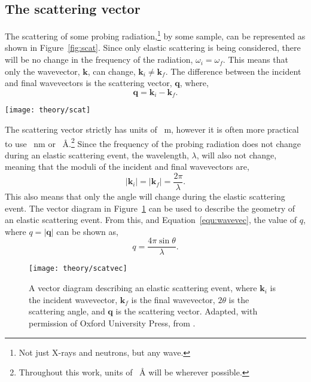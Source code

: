 \subsection{The scattering vector}
The scattering of some probing radiation,\footnote{Not just X-rays and neutrons, but any wave.} by some sample, can be represented as shown in Figure~\ref{fig:scat}.
Since only elastic scattering is being considered, there will be no change in the frequency of the radiation, $\omega_i = \omega_f$.
This means that only the wavevector, $\mathbf{k}$, can change, $\mathbf{k}_i\neq \mathbf{k}_f$.
The difference between the incident and final wavevectors is the scattering vector, $\mathbf{q}$, where,
%
\begin{equation}
    \mathbf{q} = \mathbf{k}_i - \mathbf{k}_f.
\end{equation}
%
%
\begin{marginfigure}
    \centering
    \texttt{[image: theory/scat]}
    \caption{A schematic of the scattering of some probing radiation by a sample (blue circle). Adapted, with permission of Oxford University Press, from \cite{sivia_elementary_2011}.}
    \label{fig:scat}
\end{marginfigure}
%
The scattering vector strictly has units of \si{\per\meter}, however it is often more practical to use \si{\per\nano\meter} or \si{\per\angstrom}.\footnote{Throughout this work, units of \si{\per\angstrom} will be wherever possible.}
Since the frequency of the probing radiation does not change during an elastic scattering event, the wavelength, $\lambda$, will also not change, meaning that the moduli of the incident and final wavevectors are,
%
\begin{equation}
    |\mathbf{k}_i| = |\mathbf{k}_f| = \frac{2\pi}{\lambda}.
    \label{equ:wavevec}
\end{equation}
%
This also means that only the angle will change during the elastic scattering event.
The vector diagram in Figure~\ref{fig:scatvec} can be used to describe the geometry of an elastic scattering event.
From this, and Equation~\ref{equ:wavevec}, the value of $q$, where $q = |\mathbf{q}|$ can be shown as,
%
\begin{equation}
    q = \frac{4\pi\sin{\theta}}{\lambda}.
    \label{equ:theq}
\end{equation}
%
%
\begin{figure}
    \centering
    \texttt{[image: theory/scatvec]}
    \caption{A vector diagram describing an elastic scattering event, where $\mathbf{k}_i$ is the incident wavevector, $\mathbf{k}_f$ is the final wavevector, $2\theta$ is the scattering angle, and $\mathbf{q}$ is the scattering vector. Adapted, with permission of Oxford University Press, from \cite{sivia_elementary_2011}.}
    \label{fig:scatvec}
\end{figure}
